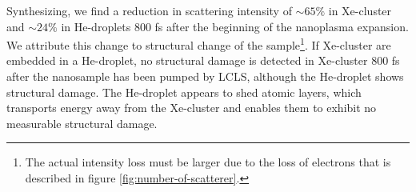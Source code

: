 Synthesizing, we find a reduction in scattering intensity of $\sim 65 \%$ in Xe-cluster and $\sim 24 \%$ in He-droplets 800 fs after the beginning of the nanoplasma expansion. We attribute this change to structural change of the sample\footnote{The actual intensity loss must be larger due to the loss of electrons that is described in figure \ref{fig:number-of-scatterer}.}. If Xe-cluster are embedded in a He-droplet, no structural damage is detected in Xe-cluster 800 fs after the nanosample has been pumped by LCLS, although the He-droplet shows structural damage. The He-droplet appears to shed atomic layers, which transports energy away from the Xe-cluster and enables them to exhibit no measurable structural damage.
%
%
%
%
%
%
%
%
%
%
%
%
%
%
%
